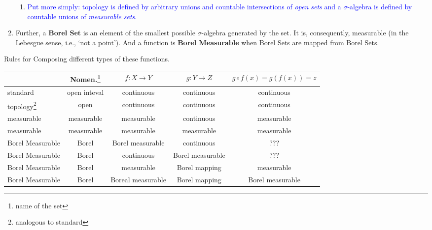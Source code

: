 \documentclass[10pt,a4paper]{report}
\newcommand{\BLUE}[1]{\textcolor{blue}{#1}}
\begin{document}
\begin{enumerate}
\begin{enumerate}
    		\item \BLUE{Put more simply: topology is defined by arbitrary unions and countable intersections of \textit{open sets} and a $\sigma$-algebra is defined by countable unions of \textit{measurable sets}.}
	\end{enumerate}      
    \item  Further, a \textbf{Borel Set} is an element of the smallest possible $\sigma$-algebra generated by the set.  It is, consequently, measurable (in the Lebesgue sense, i.e., ‘not a point’).  And a function is \textbf{Borel Measurable} when Borel Sets are mapped from Borel Sets.

\end{enumerate}

\noindent Rules for Composing different types of these functions.

\begin{tabular}{|l|c|c|c|c|}
\hline 
	& Nomen.\footnote{name of the set} & $f:X \to Y$ & $g:Y \to Z$ & $g\circ f(x) =g(f(x)) = z$ \\
	\hline
	standard & open inteval &continuous & continuous & continuous \\
	\hline
	topology\footnote{analogous to standard} & open &continuous & continuous & continuous \\
	\hline
	measurable & measurable & measurable & continuous & measurable \\
	\hline
	measurable & measurable & measurable & measurable & measurable \\
	\hline 
	Borel Measurable & Borel & Borel measurable  & continuous & ??? \\
	\hline 
	Borel Measurable & Borel & continuous & Borel measurable & ??? \\
	\hline 
	Borel Measurable & Borel & measurable & Borel mapping & measurable \\
	\hline 
	Borel Measurable & Borel & Boreal measurable & Borel mapping & Borel measurable \\
\hline
\end{tabular}
\end{document}
